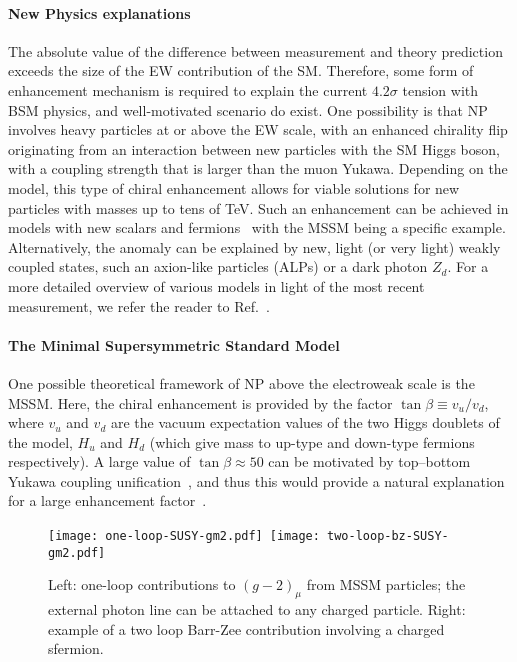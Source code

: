 \documentclass[10pt]{article}
\begin{document}
\paragraph{New Physics explanations}
%
The absolute value of the difference between measurement and theory prediction exceeds the size of the EW contribution of the SM.
Therefore, some form of enhancement mechanism is required to explain the current $4.2\sigma$ tension with BSM physics, and well-motivated scenario do exist. One possibility is that NP involves heavy particles at or above the EW scale, with an enhanced chirality flip originating from an interaction between new particles with the SM Higgs boson, with a coupling strength that is larger than the muon Yukawa. Depending on the model, this type of chiral enhancement allows for viable solutions for new particles with masses up to tens of TeV. Such an enhancement can be achieved in models with new scalars and fermions~\cite{Crivellin:2018qmi} with the MSSM being a specific example. Alternatively, the anomaly can be explained by new, light (or very light) weakly coupled states, such an axion-like particles (ALPs) or a dark photon $Z_d$. For a more detailed overview of various models in light of the most recent measurement, we refer the reader to Ref.~\cite{Athron:2021iuf}.


\paragraph{The Minimal Supersymmetric Standard Model}
%
One possible theoretical framework of NP above the electroweak scale is the MSSM. Here, the chiral enhancement is provided by the factor $\tan\beta \equiv v_u/v_d$, where
$v_u$ and $v_d$ are the vacuum expectation values of the two Higgs doublets of the model, $H_u$ and $H_d$
(which give mass to up-type and down-type fermions respectively). A large value of $\tan \beta\approx 50$ can be motivated by top--bottom Yukawa coupling unification~\cite{Ananthanarayan:1991xp,Carena:1994bv}, and thus
this would provide a natural explanation for a large enhancement factor~\cite{Lopez:1993vi,Chattopadhyay:1995ae,Dedes:2001fv}.

\begin{figure}
  \texttt{[image: one-loop-SUSY-gm2.pdf]}~\texttt{[image: two-loop-bz-SUSY-gm2.pdf]}
  \caption{Left: one-loop contributions to $(g-2)_{\mu}$ from MSSM particles; the external photon line can be attached to any charged particle. Right: example of a two loop Barr-Zee contribution involving a charged sfermion.}
  \label{gm2:mssm1l}
\end{figure}
\end{document}
